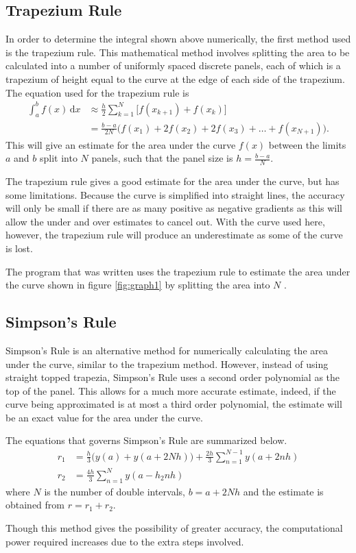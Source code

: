 \documentclass[11pt]{article} %
\renewcommand{\d}{\,\mathrm{d}} %
\begin{document}
	\subsection{Trapezium Rule}
	In order to determine the integral shown above numerically, the first method used is the trapezium rule. This mathematical method involves splitting the area to be calculated into a number of uniformly spaced discrete panels, each of which is a trapezium of height equal to the curve at the edge of each side of the trapezium. The equation used for the trapezium rule is
	\begin{align*}
		\int_a^b f(x) \d x &\approx \frac{h}{2}\sum_{k=1}^N \Big[f(x_{k+1}) + f(x_k)\Big] \\
		&= \frac{b-a}{2N} \Big( f(x_1) + 2f(x_2) + 2f(x_3) + \ldots + f(x_{N+1})\Big).
	\end{align*}
	This will give an estimate for the area under the curve $f(x)$ between the limits $a$ and $b$ split into $N$ panels, such that the panel size is $h=\frac{b-a}{N}$.

	The trapezium rule gives a good estimate for the area under the curve, but has some limitations. Because the curve is simplified into straight lines, the accuracy will only be small if there are as many positive as negative gradients as this will allow the under and over estimates to cancel out. With the curve used here, however, the trapezium rule will produce an underestimate as some of the curve is lost.

	The program that was written uses the trapezium rule to estimate the area under the curve shown in figure \ref{fig:graph1} by splitting the area into $N$ . 
	
	\subsection{Simpson's Rule}
	Simpson's Rule is an alternative method for numerically calculating the area under the curve, similar to the trapezium method. However, instead of using straight topped trapezia, Simpson's Rule uses a second order polynomial as the top of the panel. This allows for a much more accurate estimate, indeed, if the curve being approximated is at most a third order polynomial, the estimate will be an exact value for the area under the curve.

	The equations that governs Simpson's Rule are summarized below.
	\begin{align*}
		r_1 &= \frac{h}{3}\big(y(a) + y(a+2Nh)\big) + \frac{2h}{3}\sum_{n=1}^{N-1} y(a+2nh) \\
		r_2 &= \frac{4h}{3} \sum_{n=1}^{N} y(a-h_2nh)
	\end{align*}
	where $N$ is the number of double intervals, $b=a+2Nh$ and the estimate is obtained from \mbox{$r=r_1 + r_2$}.

	Though this method gives the possibility of greater accuracy, the computational power required increases due to the extra steps involved.
\end{document}
